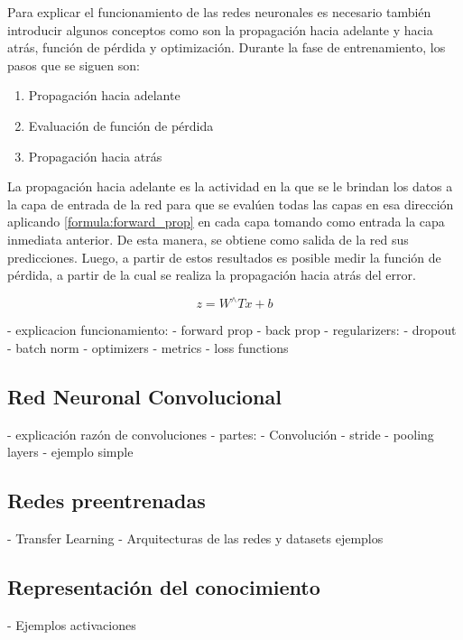  Para explicar el funcionamiento de las redes neuronales es necesario también introducir algunos conceptos como son la propagación hacia adelante y hacia atrás, función de pérdida y optimización. Durante la fase de entrenamiento, los pasos que se siguen son:
 \begin{enumerate}
 	\item Propagación hacia adelante
 	\item Evaluación de función de pérdida
 	\item Propagación hacia atrás
 \end{enumerate}
 La propagación hacia adelante es la actividad en la que se le brindan los datos a la capa de entrada de la red para que se evalúen todas las capas en esa dirección aplicando \ref{formula:forward_prop} en cada capa tomando como entrada la capa inmediata anterior. De esta manera, se obtiene como salida de la red sus predicciones. Luego, a partir de estos resultados es posible medir la función de pérdida, a partir de la cual se realiza la propagación hacia atrás del error.
  
 \begin{equation}\label{formula:forward_prop}
 z=W^{\wedge} T x+b
 \end{equation}
 


- explicacion funcionamiento:
	- forward prop 
	- back prop
	- regularizers:
		- dropout
		- batch norm
	- optimizers
	- metrics
	- loss functions
	
\subsection{Red Neuronal Convolucional}
- explicación razón de convoluciones
- partes:
	- Convolución
	- stride
	- pooling layers
- ejemplo simple

\subsection{Redes preentrenadas} 
- Transfer Learning
- Arquitecturas de las redes y datasets ejemplos

\subsection{Representación del conocimiento}
- Ejemplos activaciones